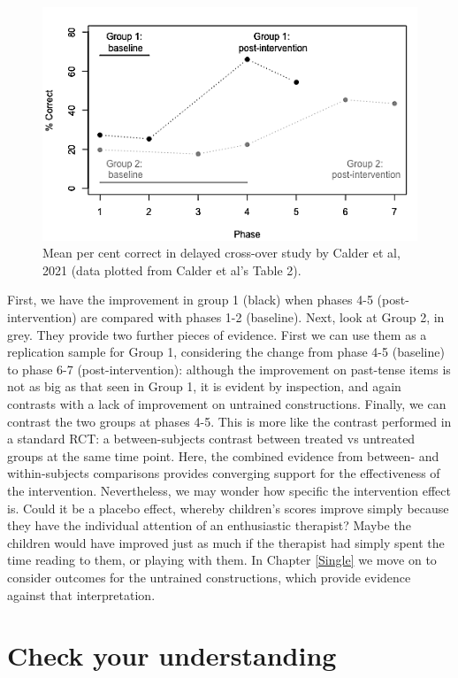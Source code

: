 \documentclass{krantz}
\begin{document}
\begin{figure}
\includegraphics[width=0.75\linewidth]{images_bw/calderfig-1} \caption{Mean per cent correct in delayed cross-over study by Calder et al, 2021 (data plotted from Calder et al's Table 2).}\label{fig:calderfig}
\end{figure}

First, we have the improvement in group 1 (black) when phases 4-5 (post-intervention) are compared with phases 1-2 (baseline). Next, look at Group 2, in grey. They provide two further pieces of evidence. First we can use them as a replication sample for Group 1, considering the change from phase 4-5 (baseline) to phase 6-7 (post-intervention): although the improvement on past-tense items is not as big as that seen in Group 1, it is evident by inspection, and again contrasts with a lack of improvement on untrained constructions. Finally, we can contrast the two groups at phases 4-5. This is more like the contrast performed in a standard RCT: a between-subjects contrast between treated vs untreated groups at the same time point. Here, the combined evidence from between- and within-subjects comparisons provides converging support for the effectiveness of the intervention. Nevertheless, we may wonder how specific the intervention effect is. Could it be a placebo effect, whereby children's scores improve simply because they have the individual attention of an enthusiastic therapist? Maybe the children would have improved just as much if the therapist had simply spent the time reading to them, or playing with them. In Chapter \ref{Single} we move on to consider outcomes for the untrained constructions, which provide evidence against that interpretation.

\hypertarget{check-your-understanding-18}{%
\section{Check your understanding}\label{check-your-understanding-18}}
\end{document}
